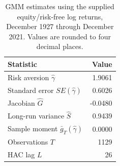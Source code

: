 \begin{table}[!htbp]
  \centering
  \caption{GMM estimates using the supplied equity/risk-free log returns,
  December 1927 through December 2021. Values are rounded to four decimal places.}
  \label{tab:q3b-gmm-summary}
  \small
  \begin{tabular}{lr}
    \toprule
    Statistic & Value \\
    \midrule
    Risk aversion $\hat\gamma$ & 1.9061 \\
    Standard error $SE(\hat\gamma)$ & 0.6026 \\
    Jacobian $\hat G$ & -0.0480 \\
    Long-run variance $\hat S$ & 0.9439 \\
    Sample moment $\bar g_T(\hat\gamma)$ & 0.0000 \\
    Observations $T$ & 1129 \\
    HAC lag $L$ & 26 \\
    \bottomrule
  \end{tabular}
\end{table}
